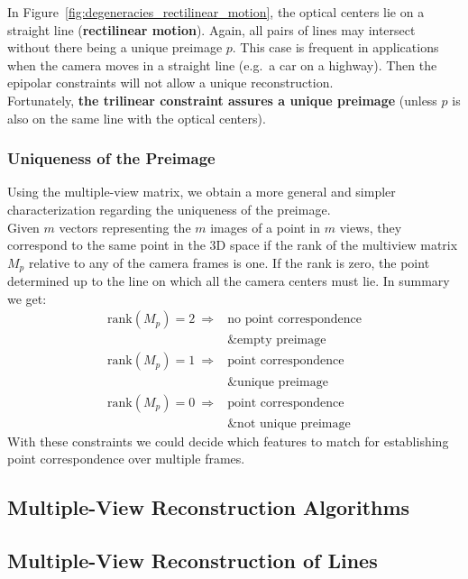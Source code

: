 In Figure~\ref{fig:degeneracies_rectilinear_motion},
the optical centers lie on a straight line (\textbf{rectilinear motion}).
Again, all pairs of lines may intersect without there being a unique preimage $p$.
This case is frequent in applications when the camera moves in a straight line
(e.g.\ a car on a highway). Then the epipolar constraints will not
allow a unique reconstruction.\\

Fortunately, \textbf{the trilinear constraint assures a unique preimage}
(unless $p$ is also on the same line with the optical centers).


\subsubsection*{Uniqueness of the Preimage}%
\label{ssub:uniqueness_of_the_preimage}

Using the multiple-view matrix, we obtain a more general and simpler
characterization regarding the uniqueness of the preimage.\\

Given $m$ vectors representing the $m$ images of a point in $m$ views,
they correspond to the same point in the 3D space if the rank of
the multiview matrix $M_p$ relative to any of the camera frames is one.
If the rank is zero, the point determined up to the line on which
all the camera centers must lie. In summary we get:
\[
	\boxed{\begin{array}{rl}
		\text{rank}(M_p) = 2\ \Rightarrow
			& \text{no point correspondence} \\
			& \text{\& empty preimage} \\
		\text{rank}(M_p) = 1\ \Rightarrow
			& \text{point correspondence} \\
			& \text{\& unique preimage} \\
		\text{rank}(M_p) = 0\ \Rightarrow
			& \text{point correspondence} \\
			& \text{\& not unique preimage}
	\end{array}}
\]
With these constraints we could decide which features to match
for establishing point correspondence over multiple frames.


\subsection{Multiple-View Reconstruction Algorithms}%
\label{sub:multiple_view_reconstruction_algorithms}


\subsection{Multiple-View Reconstruction of Lines}%
\label{sub:multiple_view_reconstruction_of_lines}


